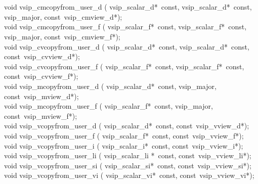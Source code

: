 \\\cvsiplh\\
\begin{cfuncs}
void vsip\_cmcopyfrom\_user\_d ( vsip\_scalar\_d*~const, vsip\_scalar\_d*~const, vsip\_major, const~vsip\_cmview\_d*);\\
void vsip\_cmcopyfrom\_user\_f ( vsip\_scalar\_f*~const, vsip\_scalar\_f*~const, vsip\_major, const~vsip\_cmview\_f*);\\
void vsip\_cvcopyfrom\_user\_d ( vsip\_scalar\_d*~const, vsip\_scalar\_d*~const, const~vsip\_cvview\_d*);\\
void vsip\_cvcopyfrom\_user\_f ( vsip\_scalar\_f*~const, vsip\_scalar\_f*~const, const~vsip\_cvview\_f*);\\
void vsip\_mcopyfrom\_user\_d ( vsip\_scalar\_d*~const, vsip\_major, const~vsip\_mview\_d*);\\
void vsip\_mcopyfrom\_user\_f ( vsip\_scalar\_f*~const, vsip\_major, const~vsip\_mview\_f*);\\
void vsip\_vcopyfrom\_user\_d ( vsip\_scalar\_d*~const, const~vsip\_vview\_d*);\\
void vsip\_vcopyfrom\_user\_f ( vsip\_scalar\_f*~const, const~vsip\_vview\_f*);\\
void vsip\_vcopyfrom\_user\_i ( vsip\_scalar\_i*~const, const~vsip\_vview\_i*);\\
void vsip\_vcopyfrom\_user\_li ( vsip\_scalar\_li *~const, const~vsip\_vview\_li*);\\
void vsip\_vcopyfrom\_user\_si ( vsip\_scalar\_si*~const, const~vsip\_vview\_si*);\\
void vsip\_vcopyfrom\_user\_vi ( vsip\_scalar\_vi*~const, const~vsip\_vview\_vi*);\\
\end{cfuncs}
\pyjvsiph
%
%
%
